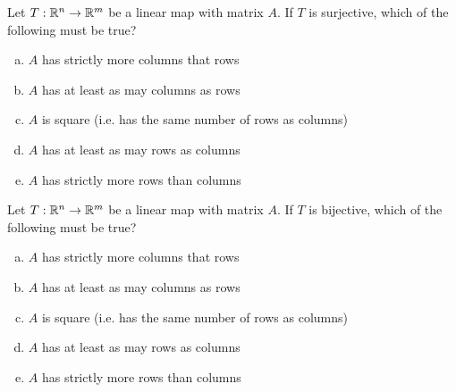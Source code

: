\begin{applicationActivities}{2}{22}
\begin{activity}{5}
Let $T: \mathbb{R}^n \rightarrow \mathbb{R}^m$ be a linear map with matrix $A$.
If $T$ is surjective, which of the following must be true?
\begin{enumerate}[(a)]
\item $A$ has strictly more columns that rows
\item $A$ has at least as may columns as rows
\item $A$ is square (i.e. has the same number of rows as columns)
\item $A$ has at least as may rows as columns
\item $A$ has strictly more rows than columns
\end{enumerate}
\end{activity}

\begin{activity}{5}
Let $T: \mathbb{R}^n \rightarrow \mathbb{R}^m$ be a linear map with matrix $A$.
If $T$ is bijective, which of the following must be true?
\begin{enumerate}[(a)]
\item $A$ has strictly more columns that rows
\item $A$ has at least as may columns as rows
\item $A$ is square (i.e. has the same number of rows as columns)
\item $A$ has at least as may rows as columns
\item $A$ has strictly more rows than columns
\end{enumerate}
\end{activity}

\end{applicationActivities}
